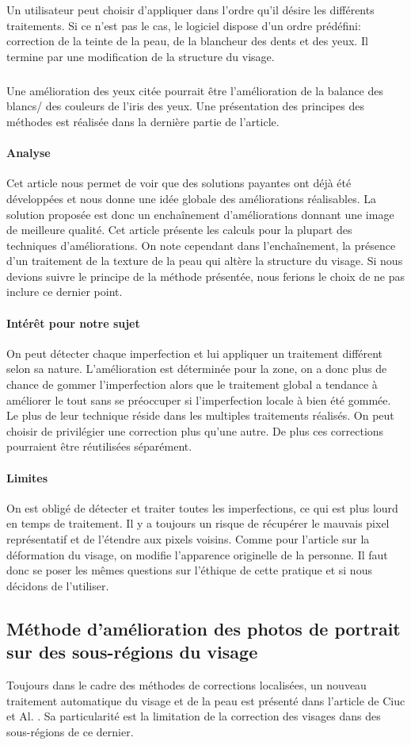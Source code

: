 \documentclass[11pt, french]{report-rd-info}
\begin{document}
Un utilisateur peut choisir d’appliquer dans l’ordre qu’il désire les différents traitements. Si ce n’est pas le cas, le logiciel dispose d’un ordre prédéfini: correction de la teinte de la peau, de la blancheur des dents et des yeux. Il termine par une modification de la structure du visage.
\subparagraph{}
Une amélioration des yeux citée pourrait être l’amélioration de la balance des blancs/ des couleurs de l’iris des yeux. Une présentation des principes des méthodes est réalisée dans la dernière partie de l’article.
\paragraph{Analyse}
Cet article nous permet de voir que des solutions payantes ont déjà été développées et nous donne une idée globale des améliorations réalisables. La solution proposée est donc un enchaînement d’améliorations donnant une image de meilleure qualité. Cet article présente les calculs pour la plupart des techniques d’améliorations. On note cependant dans l'enchaînement, la présence d’un traitement de la texture de la peau qui altère la structure du visage. Si nous devions suivre le principe de la méthode présentée, nous ferions le choix de ne pas inclure ce dernier point.
\paragraph{Intérêt pour notre sujet}
On peut détecter chaque imperfection et lui appliquer un traitement différent selon sa nature. L’amélioration est déterminée pour la zone, on a donc plus de chance de gommer l’imperfection alors que le traitement global a tendance à améliorer le tout sans se préoccuper si l’imperfection locale à bien été gommée. Le plus de leur technique réside dans les multiples traitements réalisés. On peut choisir de privilégier une correction plus qu’une autre. De plus ces corrections pourraient être réutilisées séparément.
\paragraph{Limites}
On est obligé de détecter et traiter toutes les imperfections, ce qui est plus lourd en temps de traitement.
Il y a toujours un risque de récupérer le mauvais pixel représentatif et de l’étendre aux pixels voisins.
Comme pour l’article sur la déformation du visage, on modifie l’apparence originelle de la personne. Il faut donc se poser les mêmes questions sur l’éthique de cette pratique et si nous décidons de l’utiliser.
\subsection{Méthode d’amélioration des photos de portrait sur des sous-régions du visage}
Toujours dans le cadre des méthodes de corrections localisées, un nouveau traitement automatique du visage et de la peau est présenté dans l’article de Ciuc et Al. \cite{Ciuc2010}. Sa particularité est la limitation de la correction des visages dans des sous-régions de ce dernier.
\end{document}
